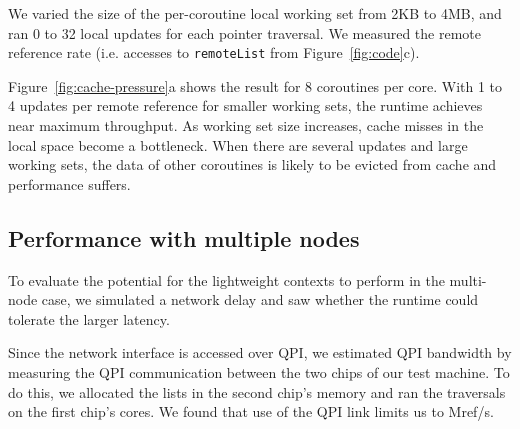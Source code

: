 \documentclass[10pt,nocopyrightspace,preprint]{sigplanconf}
\newcommand{\mrps}[1]{\unit[#1]{Mref/s}}
\begin{document}
We varied the size of the per-coroutine local working set from 2KB
to 4MB, and ran 0 to 32 local updates for each pointer
traversal. We measured the remote reference rate (i.e. accesses to \texttt{remoteList} from Figure~\ref{fig:code}c).

Figure~\ref{fig:cache-pressure}a shows the result for 8 coroutines per core. 
With 1 to 4 updates per remote reference for smaller working sets, the runtime achieves near maximum throughput. As working set size increases, cache misses in the local space become a bottleneck. When there are several updates and large working sets, the data of other coroutines is likely to be evicted from cache and performance suffers.


\subsection{Performance with multiple nodes}

To evaluate the potential for the lightweight contexts to perform in the multi-node case, we simulated a network delay and saw whether the runtime could tolerate the larger latency. 

Since the network interface is accessed over QPI, we estimated QPI bandwidth by measuring the QPI communication between the two chips of our test machine. To do this, we allocated the lists in the second chip's memory and ran the traversals on the first chip's cores. We found that use of the QPI link limits us to \mrps{175}.

\end{document}
